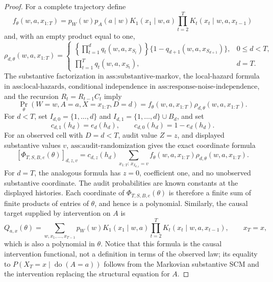 \documentclass{article}
\begin{document}
\begin{proof}
For a complete trajectory define
\[
f_\theta(w,a,x_{1:T})
=p_W(w)p_A(a\mid w)K_1(x_1\mid w,a)
 \prod_{t=2}^T K_t(x_t\mid w,a,x_{t-1})
\]
and, with an empty product equal to one,
\[
\rho_{d,\theta}(w,a,x_{1:T})=
\begin{cases}
\displaystyle
\left\{\prod_{t=1}^{d}q_t(w,a,x_{S_t})\right\}
\{1-q_{d+1}(w,a,x_{S_{d+1}})\},&0\leq d<T,\\[6pt]
\displaystyle\prod_{t=1}^{T}q_t(w,a,x_{S_t}),&d=T.
\end{cases}
\]
The substantive factorization in \(\text{ass:substantive-markov}\), the local-hazard formula in \(\text{ass:local-hazards}\), conditional independence in \(\text{ass:response-noise-independence}\), and the recursion \(R_t=R_{t-1}C_t\) imply
\[
\Pr_\theta(W=w,A=a,X=x_{1:T},D=d)
=f_\theta(w,a,x_{1:T})\rho_{d,\theta}(w,a,x_{1:T}).
\]
For \(d<T\), set \(I_{d,0}=\{1,\ldots,d\}\) and \(I_{d,1}=\{1,\ldots,d\}\cup B_d\), and set
\[
c_{d,1}(h_d)=e_d(h_d),
\qquad c_{d,0}(h_d)=1-e_d(h_d).
\]
For an observed cell with \(D=d<T\), audit value \(Z=z\), and displayed substantive values \(v\), \(\text{ass:audit-randomization}\) gives the exact coordinate formula
\[
[\Phi_{T,S,B,e}(\theta)]_{d,z,v}
=c_{d,z}(h_d)
\sum_{x_{1:T}:\,x_{I_{d,z}}=v}
f_\theta(w,a,x_{1:T})\rho_{d,\theta}(w,a,x_{1:T}).
\]
For \(d=T\), the analogous formula has \(z=0\), coefficient one, and no unobserved substantive coordinate.  The audit probabilities are known constants at the displayed histories.  Each coordinate of \(\Phi_{T,S,B,e}(\theta)\) is therefore a finite sum of finite products of entries of \(\theta\), and hence is a polynomial.  Similarly, the causal target supplied by intervention on \(A\) is
\[
Q_{a,x}(\theta)=
\sum_{w,x_1,\ldots,x_{T-1}}
p_W(w)K_1(x_1\mid w,a)
\prod_{t=2}^T K_t(x_t\mid w,a,x_{t-1}),
\qquad x_T=x,
\]
which is also a polynomial in \(\theta\).  Notice that this formula is the causal intervention functional, not a definition in terms of the observed law; its equality to \(P(X_T=x\mid\operatorname{do}(A=a))\) follows from the Markovian substantive SCM and the intervention replacing the structural equation for \(A\).


\end{proof}
\end{document}
